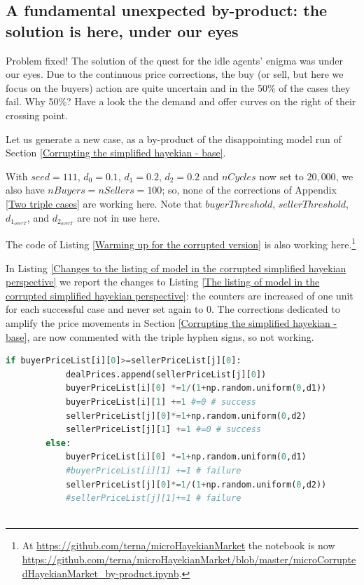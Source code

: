 \documentclass[10pt]{report}
\begin{document}
\begin{appendices}
\section{A fundamental unexpected by-product: the solution is here, under our eyes}
\label{Corrupting the simplified hayekian - by-product}

Problem fixed! The solution of the quest for the idle agents' enigma was under our eyes. Due to the continuous price corrections, the buy (or sell, but here we focus on the buyers) action are quite uncertain and in the 50\% of the cases they fail. Why 50\%? Have a look the the demand and offer curves on the right of their crossing point.

Let us generate a new case, as a by-product of the disappointing  model run of Section \ref{Corrupting the simplified hayekian - base}.

With $seed=111$,  $d_0=0.1$, $d_1=0.2$, $d_2=0.2$ and $nCycles$ now set to $20,000$, we also have $nBuyers=nSellers=100$; so, none of the corrections of Appendix \ref{Two triple cases} are working here. Note that $buyerThreshold$, $sellerThreshold$, $d_{1_{overT}}$, and $d_{2_{overT}}$ are not in use here.

The code of Listing \ref{Warming up for the corrupted version} is also working here.\footnote{At \url{https://github.com/terna/microHayekianMarket} the notebook is now \url{https://github.com/terna/microHayekianMarket/blob/master/microCorruptedHayekianMarket_by-product.ipynb}.}

In Listing \ref{Changes to the listing of model in the corrupted simplified hayekian perspective} we report the changes to Listing \ref{The listing of model in the corrupted simplified hayekian perspective}: the counters are increased of one unit for each successful case and never set again to $0$. The corrections dedicated to amplify the price movements in Section \ref{Corrupting the simplified hayekian - base}, are now commented with the triple hyphen signs, so not working.

\begin{lstlisting}[language=Python, caption=Changes to the listing of model in the corrupted simplified hayekian perspective, label={Changes to the listing of model in the corrupted simplified hayekian perspective},basicstyle=\ttfamily\footnotesize]
        if buyerPriceList[i][0]>=sellerPriceList[j][0]:
            dealPrices.append(sellerPriceList[j][0])
            buyerPriceList[i][0] *=1/(1+np.random.uniform(0,d1))
            buyerPriceList[i][1] +=1 #=0 # success
            sellerPriceList[j][0]*=1+np.random.uniform(0,d2)
            sellerPriceList[j][1] +=1 #=0 # success
        else:
            buyerPriceList[i][0] *=1+np.random.uniform(0,d1)
            #buyerPriceList[i][1] +=1 # failure
            sellerPriceList[j][0]*=1/(1+np.random.uniform(0,d2))
            #sellerPriceList[j][1]+=1 # failure
            

\end{lstlisting}
\end{appendices}
\end{document}

